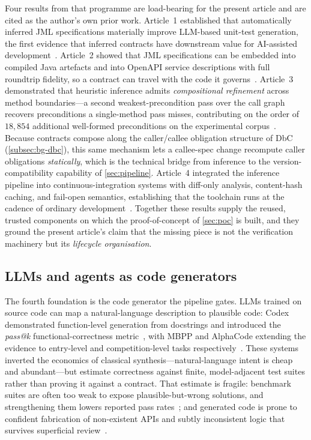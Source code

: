 Four results from that programme are load-bearing for the present article and are cited as the author's own prior work. Article~1 established that automatically inferred JML specifications materially improve LLM-based unit-test generation, the first evidence that inferred contracts have downstream value for AI-assisted development~\cite{edmonds_article1}. Article~2 showed that JML specifications can be embedded into compiled Java artefacts and into OpenAPI service descriptions with full roundtrip fidelity, so a contract can travel with the code it governs~\cite{edmonds_article2}. Article~3 demonstrated that heuristic inference admits \emph{compositional refinement} across method boundaries---a second weakest-precondition pass over the call graph recovers preconditions a single-method pass misses, contributing on the order of $18{,}854$ additional well-formed preconditions on the experimental corpus~\cite{edmonds_article3}. Because contracts compose along the caller/callee obligation structure of DbC (\cref{subsec:bg-dbc}), this same mechanism lets a callee-spec change recompute caller obligations \emph{statically}, which is the technical bridge from inference to the version-compatibility capability of \cref{sec:pipeline}. Article~4 integrated the inference pipeline into continuous-integration systems with diff-only analysis, content-hash caching, and fail-open semantics, establishing that the toolchain runs at the cadence of ordinary development~\cite{edmonds_article4}. Together these results supply the reused, trusted components on which the proof-of-concept of \cref{sec:poc} is built, and they ground the present article's claim that the missing piece is not the verification machinery but its \emph{lifecycle organisation}.

\subsection{LLMs and agents as code generators}\label{subsec:bg-llm}

The fourth foundation is the code generator the pipeline gates. LLMs trained on source code can map a natural-language description to plausible code: Codex demonstrated function-level generation from docstrings and introduced the \emph{pass@k} functional-correctness metric~\cite{chen2021codex}, with MBPP and AlphaCode extending the evidence to entry-level and competition-level tasks respectively~\cite{austin2021mbpp,li2022alphacode}. These systems inverted the economics of classical synthesis---natural-language intent is cheap and abundant---but estimate correctness against finite, model-adjacent test suites rather than proving it against a contract. That estimate is fragile: benchmark suites are often too weak to expose plausible-but-wrong solutions, and strengthening them lowers reported pass rates~\cite{liu2023evalplus}; and generated code is prone to confident fabrication of non-existent APIs and subtly inconsistent logic that survives superficial review~\cite{zhang2025hallucination}.

